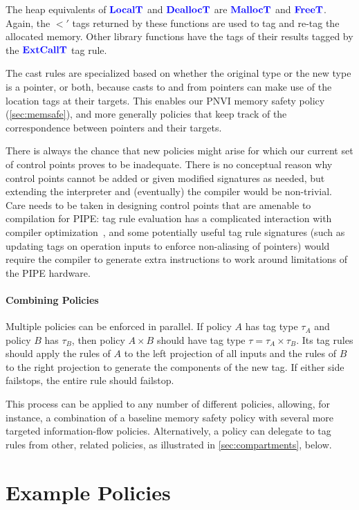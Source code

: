 \documentclass{llncs}
\begin{document}
The heap equivalents of \(\color{blue} \mathbf{LocalT}\) and \(\color{blue} \mathbf{DeallocT}\) are \(\color{blue} \mathbf{MallocT}\) and
\(\color{blue} \mathbf{FreeT}\). Again, the \(\lt'\) tags returned by these functions are used
to tag and re-tag the allocated memory.
Other library functions have the tags of their results tagged
by the \(\color{blue} \mathbf{ExtCallT}\) tag rule.

The cast rules are specialized based on whether the original type or the new type
is a pointer, or both, because casts to and from pointers can make use of the
location tags at their targets. This enables our PNVI memory safety policy (\cref{sec:memsafe}), and
more generally policies that keep track of the correspondence between pointers and their
targets.

There is always the chance that new policies might arise for which our current set of
control points proves to be inadequate. There is no conceptual reason why
control points cannot be added or given modified signatures as needed,
but extending the interpreter and (eventually) the compiler would be non-trivial.
Care needs to be taken in designing control points that are amenable
to compilation for PIPE: tag rule evaluation has a complicated interaction with
compiler optimization~\cite{Chhak21:Tagine}, and some potentially useful tag
rule signatures (such as updating tags on operation inputs to enforce non-aliasing of pointers)
would require the compiler to generate extra instructions to work
around limitations of the PIPE hardware.

\paragraph{Combining Policies}

Multiple policies can be enforced in parallel. If policy \(A\) has tag type \(\tau_A\)
and policy \(B\) has \(\tau_B\), then policy \(A \times B\) should have tag type
\(\tau = \tau_A \times \tau_B\). Its tag rules should apply the rules of \(A\) to
the left projection of all inputs and the rules of \(B\) to the right projection
to generate the components of the new tag. If either side failstops, the entire
rule should failstop.

This process can be applied to any number of different policies, allowing, for instance,
a combination of a baseline memory safety policy with several more targeted
information-flow policies. Alternatively, a policy can delegate to tag rules
from other, related policies, as illustrated in \cref{sec:compartments}, below.

\section{Example Policies}
\label{sec:policies}
\end{document}
